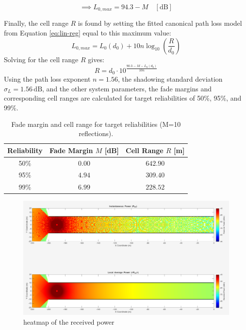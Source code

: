 \begin{equation}
	\implies \boxed{L_{0,max} = 94.3 - M} \quad [\text{dB}]
\end{equation}

Finally, the cell range $R$ is found by setting the fitted canonical path loss model from Equation \eqref{eq:lin-reg} equal to this maximum value:
\begin{equation}
	L_{0,max} = L_0(d_0) + 10n \log_{10}\left(\frac{R}{d_0}\right)
\end{equation}
Solving for the cell range $R$ gives:
\begin{equation}
	\label{eq:cell_range_R}
	R = d_0 \cdot 10^{\frac{90.3 - M - L_0(d_0)}{10n}}
\end{equation}
Using the path loss exponent $n = 1.56$, the shadowing standard deviation $\sigma_L = 1.56\,\mathrm{dB}$, and the other system parameters, the fade margins and corresponding cell ranges are calculated for target reliabilities of 50\%, 95\%, and 99\%.

\begin{table}[h!]
	\centering

	\vspace{0.3em}
	\begin{tabular}{|c|c|c|}
		\hline
		{Reliability} & {Fade Margin $M$ [dB]} & {Cell Range $R$ [m]} \\
		\hline
		50\% & 0.00 & \texttt{$642.90$} \\
		\hline
		95\% & \texttt{$4.94$} & \texttt{$309.40$} \\
		\hline
		99\% & \texttt{$6.99$} & \texttt{$228.52$} \\
		\hline
	\end{tabular}
	\caption{Fade margin and cell range for target reliabilities (M=10 reflections).}
	\label{tab:fade_margin_range}
\end{table}

\begin{figure}
	\centering
	\includegraphics[width=\linewidth]{../Code/Pictures/heatmap}
	\caption{heatmap of the received power}
	\label{fig:heatmap}
\end{figure}



